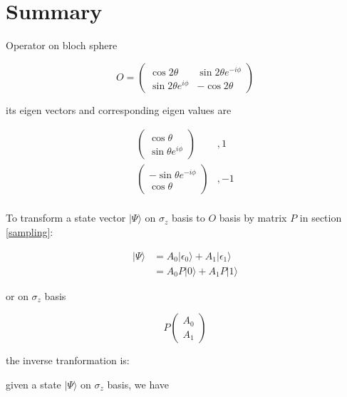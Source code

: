 \documentclass{article}
\newcommand{\rket}[1]{|#1\rangle}
\begin{document}
\section{Summary}

Operator on bloch sphere

\begin{equation}
O = \begin{pmatrix}
\cos{2\theta} & \sin{2\theta}e^{-i\phi}\\
\sin{2\theta}e^{i\phi} & -\cos{2\theta}
\end{pmatrix}
\end{equation}

its eigen vectors and corresponding eigen values are

\begin{equation}
\begin{aligned}
\begin{pmatrix}
\cos{\theta}\\
\sin{\theta}e^{i\phi}
\end{pmatrix}&, 1\\
\begin{pmatrix}
-\sin{\theta}e^{-i\phi}\\
\cos{\theta}
\end{pmatrix}&, -1\\
\end{aligned}
\end{equation}

To transform a state vector $\rket{\Psi}$ on $\sigma_z$ basis to $O$ basis by matrix $P$ in section \ref{sampling}:

\begin{equation}
\begin{aligned}
\rket{\Psi} &= A_0\rket{\epsilon_0} + A_1\rket{\epsilon_1} \\
            &= A_0 P\rket{0} + A_1 P \rket{1}
\end{aligned}
\end{equation}

or on $\sigma_z$ basis

\begin{equation}
P \begin{pmatrix}
A_0\\
A_1
\end{pmatrix}
\end{equation}

the inverse tranformation is:

given a state $\rket{\Psi}$ on $\sigma_z$ basis, we have
\end{document}
